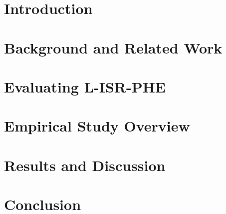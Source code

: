 \section{Introduction}



\label{sec:introduction}
%


\section{Background and Related Work}
\label{sec:related}


\section{Evaluating L-ISR-PHE}
\label{sec:methodology}



\section{Empirical Study Overview}


%
%
%
%


\section{Results and Discussion}


\section{Conclusion}

